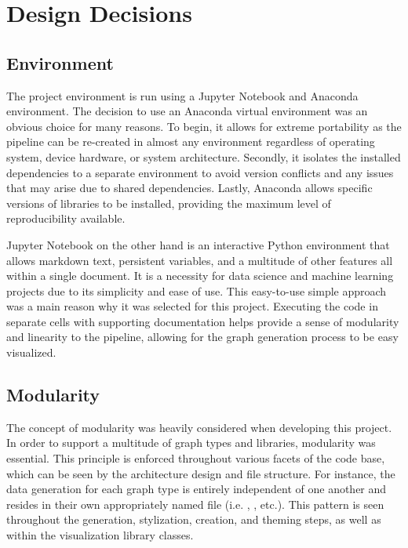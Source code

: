 \chapter{Design Decisions}

\section{Environment}
The project environment is run using a Jupyter Notebook and Anaconda environment. The decision to use an Anaconda virtual environment was an obvious choice for many reasons. To begin, it allows for extreme portability as the pipeline can be re-created in almost any environment regardless of operating system, device hardware, or system architecture. Secondly, it isolates the installed dependencies to a separate environment to avoid version conflicts and any issues that may arise due to shared dependencies. Lastly, Anaconda allows specific versions of libraries to be installed, providing the maximum level of reproducibility available. 

\hfill

Jupyter Notebook on the other hand is an interactive Python environment that allows markdown text, persistent variables, and a multitude of other features all within a single document. It is a necessity for data science and machine learning projects due to its simplicity and ease of use. This easy-to-use simple approach was a main reason why it was selected for this project. Executing the code in separate cells with supporting documentation helps provide a sense of modularity and linearity to the pipeline, allowing for the graph generation process to be easy visualized.

\section{Modularity}
\label{section:modularity}
The concept of modularity was heavily considered when developing this project. In order to support a multitude of graph types and libraries, modularity was essential. This principle is enforced throughout various facets of the code base, which can be seen by the architecture design and file structure. For instance, the data generation for each graph type is entirely independent of one another and resides in their own appropriately named file (i.e. , , etc.). This pattern is seen throughout the generation, stylization, creation, and theming steps, as well as within the visualization library classes.

